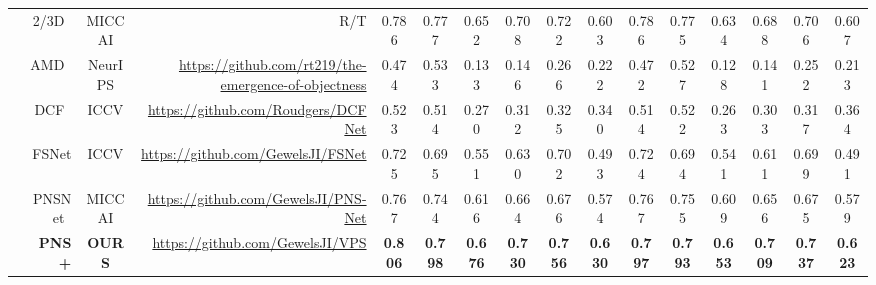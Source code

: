 \documentclass[default,iicol]{sn-jnl}
\theoremstyle{thmstyleone}
\theoremstyle{thmstyletwo}
\theoremstyle{thmstylethree}
\def\ourmodel{PNS+}
\begin{document}
\begin{table*}[t!]
\begin{tabular}{c|rcr||cccccc|cccccc}
    & 2/3D~\cite{puyal2020endoscopic} & MICCAI& R/T& 0.786 & 0.777 & 0.652 & 0.708 & 0.722 & 0.603 & 0.786 & 0.775 & 0.634 & 0.688 & 0.706 & 0.607 \\
    & AMD~\cite{liu2021emergence} & NeurIPS&\href{Link}{https://github.com/rt219/the-emergence-of-objectness}& 0.474 & 0.533 & 0.133 & 0.146 & 0.266 & 0.222 & 0.472 & 0.527 & 0.128 & 0.141 & 0.252 & 0.213 \\
    & DCF~\cite{zhang2021dynamic} & ICCV&\href{Link}{https://github.com/Roudgers/DCFNet}& 0.523 & 0.514 & 0.270 & 0.312 & 0.325 & 0.340 & 0.514 & 0.522 & 0.263 & 0.303 & 0.317 & 0.364 \\
    & FSNet~\cite{ji2021full} & ICCV&\href{Link}{https://github.com/GewelsJI/FSNet}& 0.725 & 0.695 & 0.551 & 0.630 & 0.702 & 0.493 & 0.724 & 0.694 & 0.541 & 0.611 & 0.699 & 0.491 \\
    & PNSNet~\cite{ji2021pnsnet} & MICCAI&\href{Link}{https://github.com/GewelsJI/PNS-Net}& 0.767 & 0.744 & 0.616 & 0.664 & 0.676 & 0.574 & 0.767 & 0.755 & 0.609 & 0.656 & 0.675 & 0.579 \\
    \hline
    \rowcolor{mygray}
    & \textbf{\ourmodel} & \textbf{OURS}&\href{Link}{https://github.com/GewelsJI/VPS} & \textbf{0.806} & \textbf{0.798} & \textbf{0.676} & \textbf{0.730} & \textbf{0.756} & \textbf{0.630}& \textbf{0.797} & \textbf{0.793} & \textbf{0.653} & \textbf{0.709} & \textbf{0.737} & \textbf{0.623} \\
    \hline
    \end{tabular}
\end{table*}
\end{document}
